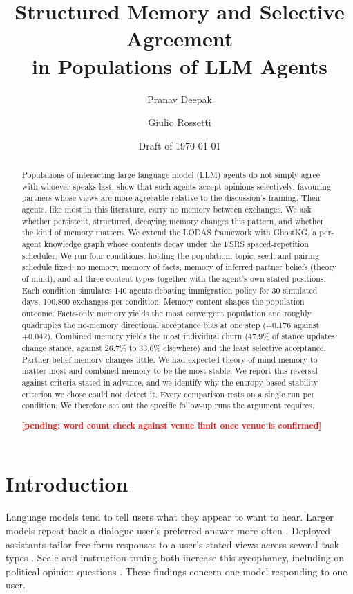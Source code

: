 \documentclass[11pt,a4paper]{article}
\title{Structured Memory and Selective Agreement\\in Populations of LLM Agents}
\author{%
  Pranav Deepak \and Giulio Rossetti\\[0.5em]
  \small\pending{author order, affiliations, and corresponding author to be agreed}
}
\date{Draft of \today}
\newcommand{\pending}[1]{\textcolor{red}{\textbf{[#1]}}}
\begin{document}
\maketitle

\begin{abstract}
Populations of interacting large language model (LLM) agents do not simply agree with whoever speaks last. \citet{cau2025selective} show that such agents accept opinions selectively, favouring partners whose views are more agreeable relative to the discussion's framing. Their agents, like most in this literature, carry no memory between exchanges. We ask whether persistent, structured, decaying memory changes this pattern, and whether the kind of memory matters. We extend the LODAS framework with GhostKG, a per-agent knowledge graph whose contents decay under the FSRS spaced-repetition scheduler. We run four conditions, holding the population, topic, seed, and pairing schedule fixed: no memory, memory of facts, memory of inferred partner beliefs (theory of mind), and all three content types together with the agent's own stated positions. Each condition simulates 140 agents debating immigration policy for 30 simulated days, 100,800 exchanges per condition. Memory content shapes the population outcome. Facts-only memory yields the most convergent population and roughly quadruples the no-memory directional acceptance bias at one step (+0.176 against +0.042). Combined memory yields the most individual churn (47.9\% of stance updates change stance, against 26.7\% to 33.6\% elsewhere) and the least selective acceptance. Partner-belief memory changes little. We had expected theory-of-mind memory to matter most and combined memory to be the most stable. We report this reversal against criteria stated in advance, and we identify why the entropy-based stability criterion we chose could not detect it. Every comparison rests on a single run per condition. We therefore set out the specific follow-up runs the argument requires.

\pending{pending: word count check against venue limit once venue is confirmed}
\end{abstract}


\section{Introduction}\label{sec:1}

Language models tend to tell users what they appear to want to hear. Larger models repeat back a dialogue user's preferred answer more often \citep{perez2023discovering}. Deployed assistants tailor free-form responses to a user's stated views across several task types \citep{sharma2023sycophancy}. Scale and instruction tuning both increase this sycophancy, including on political opinion questions \citep{wei2023synthetic}. These findings concern one model responding to one user.
\end{document}
